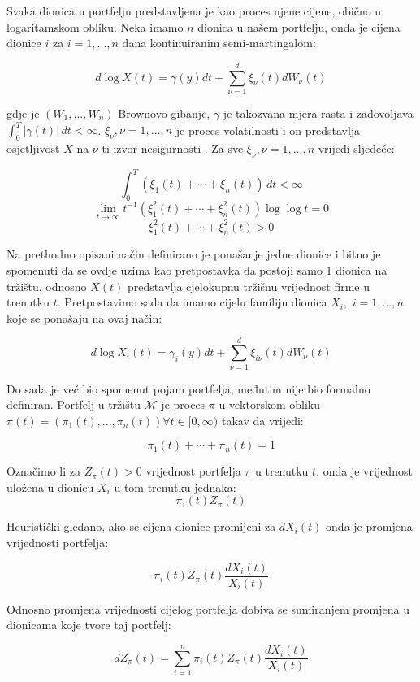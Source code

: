 \documentclass[times, utf8, seminar]{fer}
\begin{document}
Svaka dionica u portfelju predstavljena je kao proces njene cijene, obično u logaritamskom obliku. Neka imamo $n$ dionica u našem portfelju, onda je cijena dionice $i$ za $i=1,...,n$ dana kontinuiranim semi-martingalom:

\[ d \log X(t) = \gamma(y)dt + \sum_{\nu=1}^{d}\xi_{\nu}(t)dW_{\nu}(t) \]

gdje je $(W_1,...,W_n)$ Brownovo gibanje, $\gamma$ je takozvana mjera rasta  i zadovoljava \(\int_{0}^{T} |\gamma(t)| \,dt < \infty\). \(\xi_{\nu}, \nu = 1,...,n\) je proces volatilnosti  i on predstavlja osjetljivost \(X\) na \(\nu\)-ti izvor nesigurnosti .
Za sve \(\xi_{\nu}, \nu = 1,...,n\) vrijedi sljedeće:

\[ \int_{0}^{T} (\xi_1(t) + \cdots + \xi_n(t)) \,dt < \infty\]
\[ \lim_{t\to\infty} t^{-1}(\xi_1^2(t) + \cdots + \xi_n^2(t))\log\log t = 0 \]
\[ \xi_1^2(t) + \cdots + \xi_n^2(t) > 0 \]

Na prethodno opisani način definirano je ponašanje jedne dionice i bitno je spomenuti da se ovdje uzima kao pretpostavka da postoji samo 1 dionica na tržištu, odnosno \(X(t)\) predstavlja cjelokupnu tržišnu vrijednost firme u trenutku $t$.
Pretpostavimo sada da imamo cijelu familiju dionica \(X_i,\) \(i = 1,...,n\) koje  se ponašaju na ovaj način:

\[ d \log X_i(t) = \gamma_i(y)dt + \sum_{\nu=1}^{d}\xi_{i\nu}(t)dW_{\nu}(t) \]

Do sada je već bio spomenut pojam portfelja, međutim nije bio formalno definiran. Portfelj u tržištu $\mathcal{M}$ je proces $\pi$ u vektorskom obliku \( \pi(t) = (\pi_1(t),...,\pi_n(t)) \forall t\in [0,\infty) \) takav da vrijedi:

    \[ \pi_1(t) + \cdots + \pi_n(t) = 1 \]

Označimo li za $Z_{\pi}(t) > 0$ vrijednost portfelja $\pi$ u trenutku $t$, onda je vrijednost uložena u dionicu $X_i$ u tom trenutku jednaka:
    \[ \pi_i(t)Z_{\pi}(t) \]

Heuristički gledano, ako se cijena dionice promijeni za $dX_i(t)$ onda je promjena vrijednosti portfelja:

    \[ \pi_i(t)Z_{\pi}(t)\frac{dX_i(t)}{X_i(t)} \]

Odnosno promjena vrijednosti cijelog portfelja dobiva se sumiranjem promjena u dionicama koje tvore taj portfelj:

    \[ dZ_{\pi}(t) = \sum_{i=1}^{n} \pi_i(t)Z_{\pi}(t)\frac{dX_i(t)}{X_i(t)} \]
\end{document}
